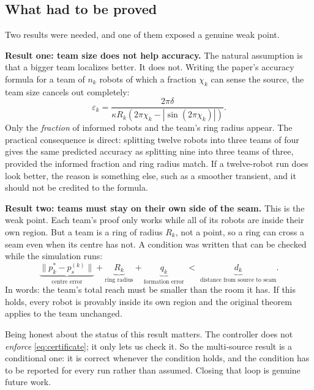 \documentclass[11pt,a4paper]{article}
\begin{document}
\subsection{What had to be proved}

Two results were needed, and one of them exposed a genuine weak point.

\textbf{Result one: team size does not help accuracy.} The natural assumption is that a bigger team
localizes better. It does not. Writing the paper's accuracy formula for a team of $n_k$ robots of
which a fraction $\chi_k$ can sense the source, the team size cancels out completely:
\begin{equation}\label{eq:teamscale}
    \varepsilon_k = \frac{2\pi\delta}{\kappa R_k \left( 2\pi\chi_k - \left|\sin(2\pi\chi_k)\right| \right)} .
\end{equation}
Only the \emph{fraction} of informed robots and the team's ring radius appear. The practical
consequence is direct: splitting twelve robots into three teams of four gives the same predicted
accuracy as splitting nine into three teams of three, provided the informed fraction and ring radius
match. If a twelve-robot run does look better, the reason is something else, such as a smoother
transient, and it should not be credited to the formula.

\textbf{Result two: teams must stay on their own side of the seam.} This is the weak point. Each
team's proof only works while all of its robots are inside their own region. But a team is a ring of
radius $R_k$, not a point, so a ring can cross a seam even when its centre has not. A condition was
written that can be checked while the simulation runs:
\begin{equation}\label{eq:certificate}
    \underbrace{\|p_k^* - p_s^{(k)}\|}_{\text{centre error}}
    + \underbrace{R_k}_{\text{ring radius}}
    + \underbrace{q_k}_{\text{formation error}}
    \;<\;
    \underbrace{d_k}_{\text{distance from source to seam}} .
\end{equation}
In words: the team's total reach must be smaller than the room it has. If this holds, every robot is
provably inside its own region and the original theorem applies to the team unchanged.

Being honest about the status of this result matters. The controller does not \emph{enforce}
\eqref{eq:certificate}; it only lets us check it. So the multi-source result is a conditional one:
it is correct whenever the condition holds, and the condition has to be reported for every run
rather than assumed. Closing that loop is genuine future work.
\end{document}
